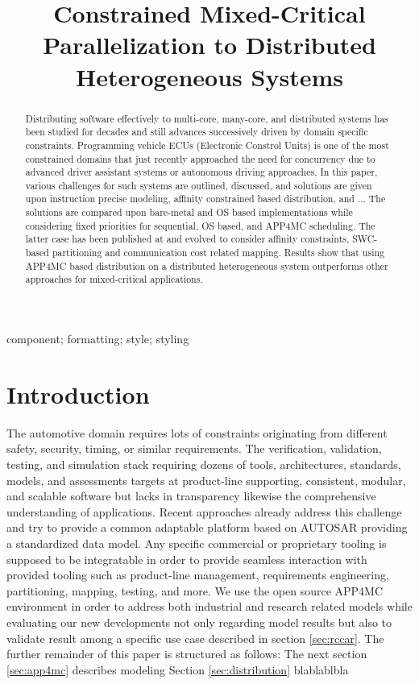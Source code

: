 \documentclass [a4paper,final,conference,10pt]{IDAACS}
\title{Constrained Mixed-Critical Parallelization to Distributed Heterogeneous Systems}
\author{
\IEEEauthorblockN{Robert Höttger\IEEEauthorrefmark{1}, Mustafa Özcelikörs\IEEEauthorrefmark{1}}

\IEEEauthorblockA{\IEEEauthorrefmark{1}Dortmund University of Applied Sciences and Arts - IDiAL Institute, \\\{robert.hoettger, mustafa.ozcelikors\}@fh-dortmund.de, www.idial.org\\
	}
}
\begin{document}
\maketitle

\let\thefootnote\relax{}

\begin{abstract}
Distributing software effectively to multi-core, many-core, and distributed systems has been studied for decades and still advances successively driven by domain specific constraints. Programming vehicle ECUs (Electronic Constrol Units) is one of the most constrained domains that just recently approached the need for concurrency due to advanced driver assistant systems or autonomous driving approaches. In this paper, various challenges for such systems are outlined, discussed, and solutions are given upon instruction precise modeling, affinity constrained based distribution, and ... The solutions are compared upon bare-metal and OS based implementations while considering fixed priorities for sequential, OS based, and APP4MC scheduling. The latter case has been published at \cite{ICPDSSE} and evolved to consider affinity constraints, SWC-based partitioning and communication cost related mapping. Results show that using APP4MC based distribution on a distributed heterogeneous system outperforms other approaches for mixed-critical applications. %

\end{abstract}

\begin{IEEEkeywords}
component; formatting; style; styling
\end{IEEEkeywords}

\section{Introduction}

The automotive domain requires lots of constraints originating from different safety, security, timing, or similar requirements. The verification, validation, testing, and simulation stack requiring dozens of tools, architectures, standards, models, and assessments targets at product-line supporting, consistent, modular, and scalable software but lacks in transparency likewise the comprehensive understanding of applications. Recent approaches already address this challenge and try to provide a common adaptable platform based on AUTOSAR providing a standardized data model. Any specific commercial or proprietary tooling is supposed to be integratable in order to provide seamless interaction with provided tooling such as product-line management, requirements engineering, partitioning, mapping, testing, and more. 
We use the open source APP4MC environment in order to address both industrial and research related models while evaluating our new developments not only regarding model results but also to validate result among a specific use case described in section \ref{sec:rccar}.
The further remainder of this paper is structured as follows: The next section \ref{sec:app4mc} describes modeling 
Section \ref{sec:distribution}
blablablbla 
\end{document}

